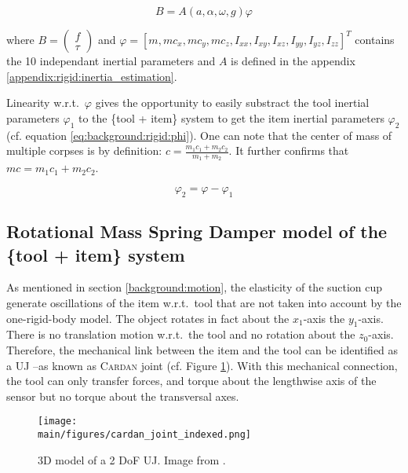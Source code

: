 \documentclass[/home/francois/latex/report/main.tex]{subfiles}
\begin{document}
\begin{equation}
  \label{background:eq:inertia_estimation}
B = A(a, \alpha, \omega, g) \varphi
\end{equation}

where $B =  \begin{pmatrix} f \\ \tau \end{pmatrix}$ and $\varphi = [m, m c_x, m c_y, m c_z, I_{xx}, I_{xy}, I_{xz}, I_{yy}, I_{yz}, I_{zz}]^T$ contains the 10 independant inertial parameters and $A$ is defined in the appendix \ref{appendix:rigid:inertia_estimation}.

Linearity w.r.t.\ $\varphi$ gives the opportunity to easily substract the tool inertial parameters $\varphi_1$ to the \{tool + item\} system to get the item inertial parameters $\varphi_2$ (cf. equation \ref{eq:background:rigid:phi}). One can note that the center of mass of multiple corpses is by definition: $c = \frac{m_1 c_1 + m_2 c_2}{m_1 + m_2}$. It further confirms that $mc = m_1 c_1 + m_2 c_2$.

\begin{equation}
  \label{eq:background:rigid:phi}
  \varphi_2 = \varphi - \varphi_{1}
\end{equation}


\subsection{Rotational Mass Spring Damper model of the \{tool + item\} system}

As mentioned in section \ref{background:motion}, the elasticity of the suction cup generate oscillations of the item w.r.t.\ tool that are not taken into account by the one-rigid-body model. The object rotates in fact about the $x_1$-axis the $y_1$-axis. There is no translation motion w.r.t.\ the tool and no rotation about the $z_0$-axis. Therefore, the mechanical link between the item and the tool can be identified as a \ac{UJ} –as known as \textsc{Cardan} joint (cf. Figure \ref{fig:background:cardan}). With this mechanical connection, the tool can only transfer forces, and torque about the lengthwise axis of the sensor but no torque about the transversal axes.

\begin{figure}[h]
  \centering
  \texttt{[image: \\main/figures/cardan\_joint\_indexed.png]}
  \caption{3D model of a 2 \ac{DoF} \ac{UJ}. Image from \cite{3dexport2020}.}
  \label{fig:background:cardan}
\end{figure}
\end{document}
